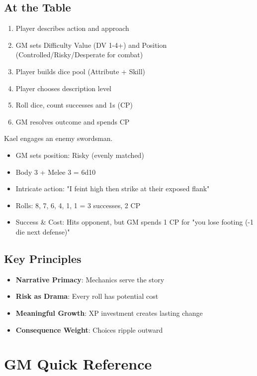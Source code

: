 \documentclass[11pt]{article}
\begin{document}
\subsection{At the Table}
\begin{enumerate}
    \item Player describes action and approach
    \item GM sets Difficulty Value (DV 1-4+) and Position (Controlled/Risky/Desperate for combat)
    \item Player builds dice pool (Attribute + Skill)
    \item Player chooses description level
    \item Roll dice, count successes and 1s (CP)
    \item GM resolves outcome and spends CP
\end{enumerate}

\begin{examplebox}
Kael engages an enemy swordsman.
\begin{itemize}
    \item GM sets position: Risky (evenly matched)
    \item Body 3 + Melee 3 = 6d10
    \item Intricate action: "I feint high then strike at their exposed flank"
    \item Rolls: 8, 7, 6, 4, 1, 1 = 3 successes, 2 CP
    \item Success \& Cost: Hits opponent, but GM spends 1 CP for "you lose footing (-1 die next defense)"
\end{itemize}
\end{examplebox}

\subsection{Key Principles}
\begin{itemize}
    \item \textbf{Narrative Primacy}: Mechanics serve the story
    \item \textbf{Risk as Drama}: Every roll has potential cost
    \item \textbf{Meaningful Growth}: XP investment creates lasting change
    \item \textbf{Consequence Weight}: Choices ripple outward
\end{itemize}

\section{GM Quick Reference}
\end{document}
